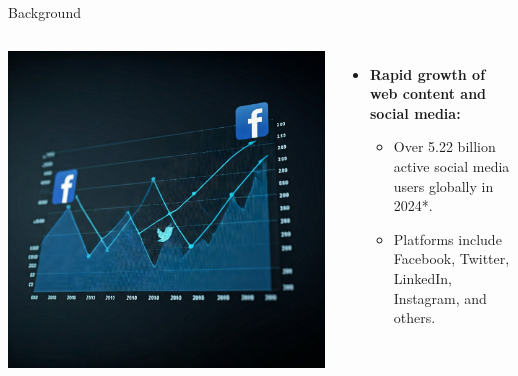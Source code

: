 \documentclass{beamer}
\begin{document}
    \begin{frame}{Background}
        \begin{columns}[T]
            \vspace{-0.25cm}
            \begin{center}
                \includegraphics[width=1.35\textwidth, keepaspectratio]{images/introduction_and_motivation_background_slide_image.jpeg}
            \end{center}

            \vspace{0.5cm}
            \begin{itemize}
                \item \textbf{Rapid growth of web content and social media:}
                \begin{itemize}
                    \item Over 5.22 billion active social media users globally in 2024\**.
                    \item Platforms include Facebook, Twitter, LinkedIn, Instagram, and others.
                \end{itemize}
            \end{itemize}
        \end{columns}


\end{frame}
\end{document}
